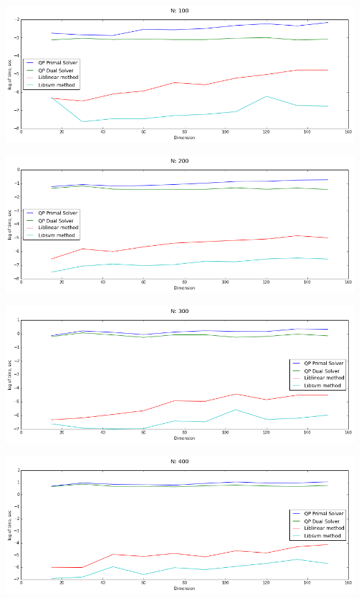 \documentclass[12pt, a4paper]{article}
\begin{document}
			\begin{center}
				\includegraphics[width=17cm]{1par_N100_one.png}
			\end{center}

			\begin{center}
				\includegraphics[width=17cm]{1par_N200_one.png}
			\end{center}

			\begin{center}
				\includegraphics[width=17cm]{1par_N300_one.png}
			\end{center}

			\begin{center}
				\includegraphics[width=17cm]{1par_N400_one.png}
			\end{center}
\end{document}
